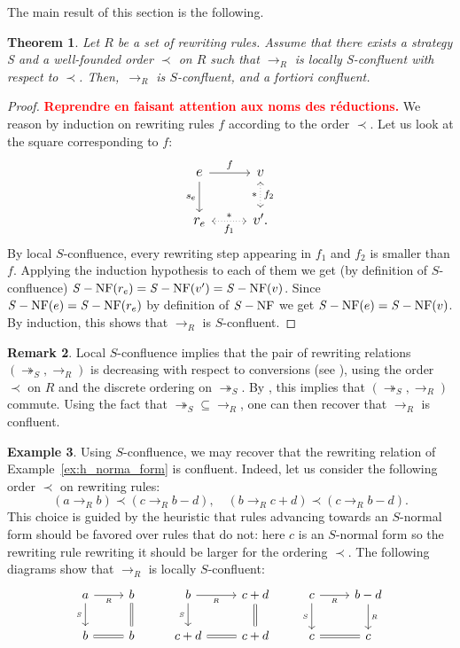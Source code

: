 \documentclass[10pt]{easychair}
\newtheorem{theorem}{Theorem}[section]
\theoremstyle{definition}
\newtheorem{remark}[theorem]{Remark}
\newtheorem{example}[theorem]{Example}
\newcommand\todo[1]{{\bf\textcolor{red}{#1}}}
\newcommand\rewR{\to_R}
\newcommand\rewS{\twoheadrightarrow_S}
\DeclareMathOperator{\SNF}{{\it S}-NF}
\begin{document}
The main result of this section is the following.
\medskip

\begin{theorem}\label{thm:confluence_criterion}
  Let $R$ be a set of rewriting rules. Assume that there exists a
  strategy S and a well-founded order $\prec$ on $R$ such that $\rewR$ is
  locally S-confluent with respect to $\prec$. Then,~$\rewR$ is
  $S$-confluent, and \emph{a fortiori} confluent. 
\end{theorem}

\begin{proof}
  \todo{Reprendre en faisant attention aux noms des réductions.}
  We reason by induction on rewriting rules $f$ according to the order
  $\prec$. Let us look at the square corresponding to $f$:
  \[\large\begin{tikzcd}
  e\ar[r, "f"]\ar[d, "s_e"'] & v\ar[d, leftrightarrow, dotted, "*"', "f_2"]\\
  r_e\ar[r, leftrightarrow, dotted, "*", "f_1"'] & v'.
  \end{tikzcd}\]
  By local $S$-confluence, every rewriting step appearing
  in $f_1$ and $f_2$ is smaller than $f$.
  Applying the induction hypothesis to each of them we get
  (by definition of $S$-confluence) $\SNF(r_e) = \SNF(v') = \SNF(v)$.
  Since $\SNF(e) = \SNF(r_e)$ by definition of $\SNF$ we get
  $\SNF(e) = \SNF(v)$. By induction, this shows that $\rewR$ is
  $S$-confluent.
\end{proof}
\medskip

\begin{remark}
  Local $S$-confluence implies that the pair of rewriting relations
  $(\rewS,\rewR)$ is decreasing with respect to conversions (see
  \cite[Definition 3]{van2008confluence}), using the order $\prec$ on $R$
  and the discrete ordering on $\rewS$. By
  \cite[Theorem 3]{van2008confluence}, this implies that $(\rewS,\rewR)$
  commute. Using the fact that $\rewS \subseteq \rewR$, one can then
  recover that $\rewR$ is confluent.
\end{remark}
\smallskip

\begin{example}\label{ex:end_to_example}
  Using $S$-confluence, we may recover that the rewriting relation of
  Example~\ref{ex:h_norma_form} is confluent. Indeed, let us consider the
  following order $\prec$ on rewriting rules:
  \[(a\rewR b)\prec(c\rewR b-d),\quad(b\rewR c+d)\prec(c\rewR b-d).\]
  This choice is guided by the heuristic that rules advancing towards an
  $S$-normal form should be favored over rules that do not: here $c$ is
  an $S$-normal form so the rewriting rule rewriting it should be larger
  for the ordering $\prec$.
  The following diagrams show that $\rewR$ is locally $S$-confluent:
  \[\begin{tikzcd}
  a\ar[r, "_R"']\ar[d, "_S"'] & b\ar[d, equal] & b\ar[r, "_R"']
  \ar[d, "_S"'] & c+d\ar[d, equal] & c\ar[r, "_R"']\ar[d,
    "_S"'] & b-d\ar[d, "_R"]\\
  b\ar[r, equal] & b & c+d\ar[r, equal] & c+d & c\ar[r, equal] & c
  \end{tikzcd}\]
\end{example}
\smallskip
\end{document}
